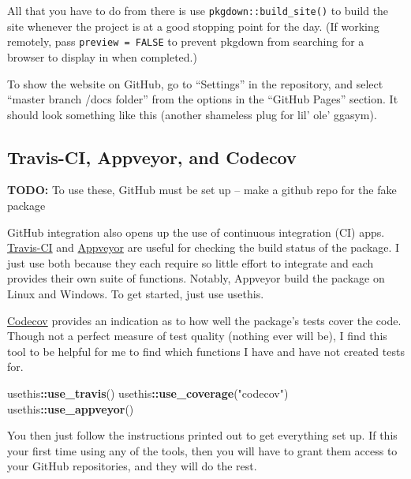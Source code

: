\documentclass[]{book}
\newenvironment{Shaded}{\begin{snugshade}}{\end{snugshade}}
\newcommand{\KeywordTok}[1]{\textcolor[rgb]{0.13,0.29,0.53}{\textbf{#1}}}
\newcommand{\StringTok}[1]{\textcolor[rgb]{0.31,0.60,0.02}{#1}}
\newcommand{\OperatorTok}[1]{\textcolor[rgb]{0.81,0.36,0.00}{\textbf{#1}}}
\newcommand{\NormalTok}[1]{#1}
\begin{document}
All that you have to do from there is use
\texttt{pkgdown::build\_site()} to build the site whenever the project
is at a good stopping point for the day. (If working remotely, pass
\texttt{preview\ =\ FALSE} to prevent pkgdown from searching for a
browser to display in when completed.)

To show the website on GitHub, go to ``Settings'' in the repository, and
select ``master branch /docs folder'' from the options in the ``GitHub
Pages'' section. It should look something like this (another shameless
plug for lil' ole' ggasym).

\subsection{Travis-CI, Appveyor, and
Codecov}\label{travis-ci-appveyor-and-codecov}

\textbf{TODO:} To use these, GitHub must be set up -- make a github repo
for the fake package

GitHub integration also opens up the use of continuous integration (CI)
apps. \href{https://travis-ci.org}{Travis-CI} and
\href{https://www.appveyor.com}{Appveyor} are useful for checking the
build status of the package. I just use both because they each require
so little effort to integrate and each provides their own suite of
functions. Notably, Appveyor build the package on Linux and Windows. To
get started, just use usethis.

\href{https://codecov.io}{Codecov} provides an indication as to how well
the package's tests cover the code. Though not a perfect measure of test
quality (nothing ever will be), I find this tool to be helpful for me to
find which functions I have and have not created tests for.

\begin{Shaded}
\begin{Highlighting}[]
\NormalTok{usethis}\OperatorTok{::}\KeywordTok{use_travis}\NormalTok{()}
\NormalTok{usethis}\OperatorTok{::}\KeywordTok{use_coverage}\NormalTok{(}\StringTok{"codecov"}\NormalTok{)}
\NormalTok{usethis}\OperatorTok{::}\KeywordTok{use_appveyor}\NormalTok{()}
\end{Highlighting}
\end{Shaded}

You then just follow the instructions printed out to get everything set
up. If this your first time using any of the tools, then you will have
to grant them access to your GitHub repositories, and they will do the
rest.
\end{document}
